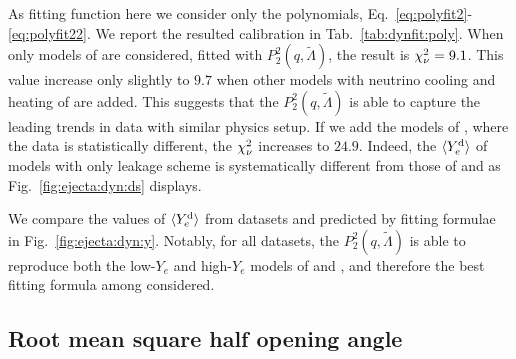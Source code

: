 As fitting function here we consider only the polynomials, Eq.~\eqref{eq:polyfit2}-\eqref{eq:polyfit22}. 
We report the resulted calibration in Tab.~\ref{tab:dynfit:poly}.
When only models of \DSrefset{} are considered, fitted with $P_2^2(q,\tilde{\Lambda})$, the result is $\chi_{\nu}^2=9.1$. This value increase only slightly to $9.7$ when other models with 
neutrino cooling and heating of \DSheatcool{} are added. This suggests that the 
$P_2^2(q,\tilde{\Lambda})$ is able to capture the leading trends in data with similar 
physics setup. If we add the models of \DScool{}, where the data is statistically different, 
the $\chi_{\nu}^2$ increases to $24.9$. Indeed, the $\langle Y^{\text{d}}_{e}\rangle$ of models with only leakage scheme 
is systematically different from those of \DSheatcool{} and \DSrefset{} 
as Fig.~\ref{fig:ejecta:dyn:ds} displays.

We compare the values of $\langle Y^{\text{d}}_{e}\rangle$ from datasets and predicted by fitting formulae in 
Fig.~\ref{fig:ejecta:dyn:y}. Notably, for all datasets, the $P_2^2(q,\tilde\Lambda)$ is able to 
reproduce both the low-$Y_e$ and high-$Y_e$ models of \DSheatcool{} and \DSrefset{}, and therefore the best fitting formula among considered.


\subsection{Root mean square half opening angle} \label{sec:stat:thetarms}

